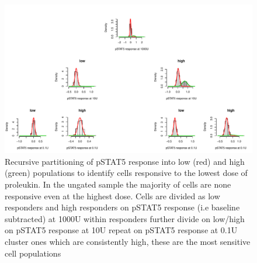 \hspace{-2cm}
\begin{figure}[h]
\centering
\includegraphics[scale=.5]{IL2/figures/pstat5-rpart.pdf}
{ Recursive partitioning of pSTAT5 response into low (red) and high (green) populations to identify cells responsive to the lowest dose of proleukin. }
{
In the ungated sample the majority of cells are none responsive even at the highest dose.
Cells are divided as low responders and high responders on pSTAT5 response (i.e baseline subtracted) at 1000U 
within responders further divide on low/high on pSTAT5 response at 10U
repeat on pSTAT5 response at 0.1U
cluster ones which are consistently high, these are the most sensitive cell populations 
}
\end{figure}


